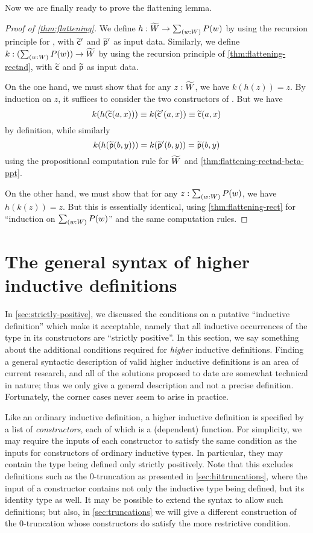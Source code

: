 Now we are finally ready to prove the flattening lemma.

\begin{proof}[Proof of \autoref{thm:flattening}]
  We define $h:\Wtil \to \sm{w:W}P(w)$ by using the recursion principle for \Wtil, with $\widetilde{\mathsf{c}}'$ and $\widetilde{\mathsf{p}}'$ as input data.
  Similarly, we define $k:(\sm{w:W}P(w)) \to \Wtil$ by using the recursion principle of \autoref{thm:flattening-rectnd}, with $\widetilde{\mathsf{c}}$ and $\widetilde{\mathsf{p}}$ as input data.

  On the one hand, we must show that for any $z:\widetilde{W}$, we have $k(h(z))=z$.
  By induction on $z$, it suffices to consider the two constructors of \Wtil.
  But we have
  \[k(h(\widetilde{\mathsf{c}}(a,x))) \equiv k(\widetilde{\mathsf{c}}'(a,x)) \equiv \widetilde{\mathsf{c}}(a,x)\]
  by definition, while similarly
  \[{k}\mathopen{}\left({{h}\mathopen{}\left({\widetilde{\mathsf{p}}(b,y)}\right)\mathclose{}}\right)\mathclose{} = {k}\mathopen{}\left({\widetilde{\mathsf{p}}'(b,y)}\right)\mathclose{} = \widetilde{\mathsf{p}}(b,y) \]
  using the propositional computation rule for $\widetilde{W}$ and \autoref{thm:flattening-rectnd-beta-ppt}.

  On the other hand, we must show that for any $z:\sm{w:W}P(w)$, we have $h(k(z))=z$.
  But this is essentially identical, using \autoref{thm:flattening-rect} for ``induction on $\sm{w:W}P(w)$'' and the same computation rules.
\end{proof}

\section{The general syntax of higher inductive definitions}
\label{sec:naturality}

In \autoref{sec:strictly-positive}, we discussed the conditions on a putative ``inductive definition'' which make it acceptable, namely that all inductive occurrences of the type in its constructors are ``strictly positive''.
In this section, we say something about the additional conditions required for \emph{higher} inductive definitions.
Finding a general syntactic description of valid higher inductive definitions is an area of current research, and all of the solutions proposed to date are somewhat technical in nature; thus we only give a general description and not a precise definition.
Fortunately, the corner cases never seem to arise in practice.

Like an ordinary inductive definition, a higher inductive definition is specified by a list of \emph{constructors}, each of which is a (dependent) function.
For simplicity, we may require the inputs of each constructor to satisfy the same condition as the inputs for constructors of ordinary inductive types.
In particular, they may contain the type being defined only strictly positively.
Note that this excludes definitions such as the $0$-truncation as presented in \autoref{sec:hittruncations}, where the input of a constructor contains not only the inductive type being defined, but its identity type as well.
It may be possible to extend the syntax to allow such definitions; but also, in \autoref{sec:truncations} we will give a different construction of the $0$-truncation whose constructors do satisfy the more restrictive condition.

